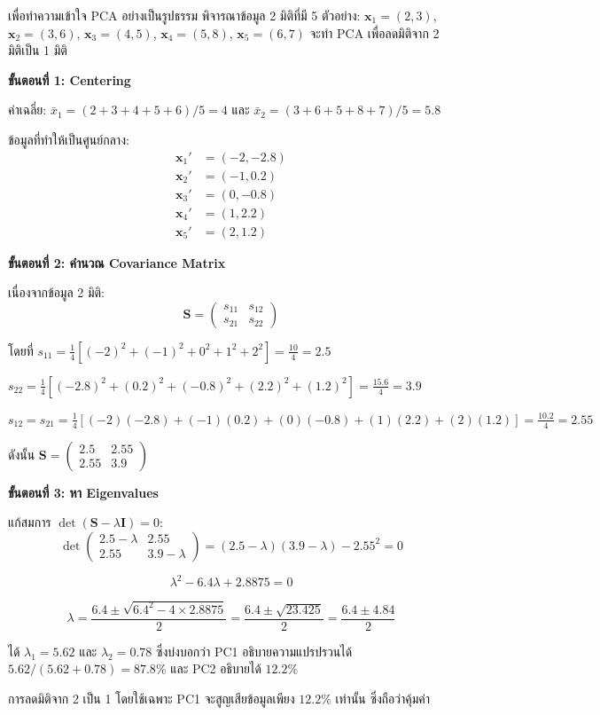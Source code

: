 \begin{exmp}
เพื่อทำความเข้าใจ PCA อย่างเป็นรูปธรรม พิจารณาข้อมูล 2 มิติที่มี 5 ตัวอย่าง: $\mathbf{x}_1 = (2, 3)$, $\mathbf{x}_2 = (3, 6)$, $\mathbf{x}_3 = (4, 5)$, $\mathbf{x}_4 = (5, 8)$, $\mathbf{x}_5 = (6, 7)$ จะทำ PCA เพื่อลดมิติจาก 2 มิติเป็น 1 มิติ

\textbf{ขั้นตอนที่ 1: Centering}

ค่าเฉลี่ย: $\bar{x}_1 = (2+3+4+5+6)/5 = 4$ และ $\bar{x}_2 = (3+6+5+8+7)/5 = 5.8$

ข้อมูลที่ทำให้เป็นศูนย์กลาง:
\begin{align*}
\mathbf{x}_1' &= (-2, -2.8) \\
\mathbf{x}_2' &= (-1, 0.2) \\
\mathbf{x}_3' &= (0, -0.8) \\
\mathbf{x}_4' &= (1, 2.2) \\
\mathbf{x}_5' &= (2, 1.2)
\end{align*}

\textbf{ขั้นตอนที่ 2: คำนวณ Covariance Matrix}

เนื่องจากข้อมูล 2 มิติ:
$$\mathbf{S} = \begin{pmatrix} s_{11} & s_{12} \\ s_{21} & s_{22} \end{pmatrix}$$

โดยที่ $s_{11} = \frac{1}{4}[(-2)^2 + (-1)^2 + 0^2 + 1^2 + 2^2] = \frac{10}{4} = 2.5$

$s_{22} = \frac{1}{4}[(-2.8)^2 + (0.2)^2 + (-0.8)^2 + (2.2)^2 + (1.2)^2] = \frac{15.6}{4} = 3.9$

$s_{12} = s_{21} = \frac{1}{4}[(-2)(-2.8) + (-1)(0.2) + (0)(-0.8) + (1)(2.2) + (2)(1.2)] = \frac{10.2}{4} = 2.55$

ดังนั้น $\mathbf{S} = \begin{pmatrix} 2.5 & 2.55 \\ 2.55 & 3.9 \end{pmatrix}$

\textbf{ขั้นตอนที่ 3: หา Eigenvalues}

แก้สมการ $\det(\mathbf{S} - \lambda\mathbf{I}) = 0$:
$$\det\begin{pmatrix} 2.5-\lambda & 2.55 \\ 2.55 & 3.9-\lambda \end{pmatrix} = (2.5-\lambda)(3.9-\lambda) - 2.55^2 = 0$$

$$\lambda^2 - 6.4\lambda + 2.8875 = 0$$

$$\lambda = \frac{6.4 \pm \sqrt{6.4^2 - 4 \times 2.8875}}{2} = \frac{6.4 \pm \sqrt{23.425}}{2} = \frac{6.4 \pm 4.84}{2}$$

ได้ $\lambda_1 = 5.62$ และ $\lambda_2 = 0.78$ ซึ่งบ่งบอกว่า PC1 อธิบายความแปรปรวนได้ $5.62/(5.62+0.78) = 87.8\%$ และ PC2 อธิบายได้ $12.2\%$

การลดมิติจาก 2 เป็น 1 โดยใช้เฉพาะ PC1 จะสูญเสียข้อมูลเพียง $12.2\%$ เท่านั้น ซึ่งถือว่าคุ้มค่า
\end{exmp}

